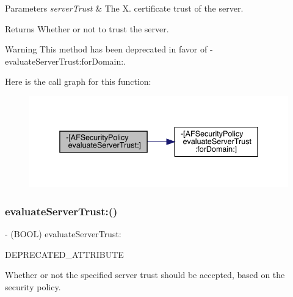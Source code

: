 \begin{DoxyParams}{Parameters}
{\em server\+Trust} & The X. certificate trust of the server.\\
\hline
\end{DoxyParams}
\begin{DoxyReturn}{Returns}
Whether or not to trust the server.
\end{DoxyReturn}
\begin{DoxyWarning}{Warning}
This method has been deprecated in favor of {\ttfamily -\/evaluate\+Server\+Trust\+:for\+Domain\+:}. 
\end{DoxyWarning}
Here is the call graph for this function\+:\nopagebreak
\begin{figure}[H]
\begin{center}
\leavevmode
\includegraphics[width=338pt]{interface_a_f_security_policy_a404e83f245843cb7fd6408d5e9ee15e0_cgraph}
\end{center}
\end{figure}
\mbox{\label{interface_a_f_security_policy_a404e83f245843cb7fd6408d5e9ee15e0}} 
\subsubsection{\texorpdfstring{evaluate\+Server\+Trust\+:()}{evaluateServerTrust:()}\hspace{0.1cm}{\footnotesize\ttfamily [3/3]}}
{\footnotesize\ttfamily -\/ (B\+O\+OL) evaluate\+Server\+Trust\+: \begin{DoxyParamCaption}\item[{(Sec\+Trust\+Ref)}]{D\+E\+P\+R\+E\+C\+A\+T\+E\+D\+\_\+\+A\+T\+T\+R\+I\+B\+U\+TE }\end{DoxyParamCaption}}

Whether or not the specified server trust should be accepted, based on the security policy.

